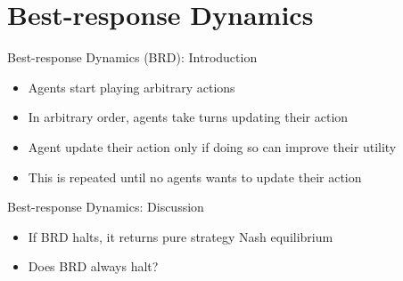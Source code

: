 \documentclass[11pt,aspectratio=169,handout]{beamer}
\begin{document}
 
 \section{Best-response Dynamics}  
  
  \begin{frame}{Best-response Dynamics (BRD): Introduction}
   \begin{itemize}[<+->]
    \item Agents start playing \alert{arbitrary} actions
    \item In arbitrary order, agents take turns updating their action
    \item Agent update their action only if doing so can improve their utility
    \item This is repeated until no agents wants to update their action
   \end{itemize}
   \vspace{1em}
  \end{frame}
  
  
  \begin{frame}{Best-response Dynamics: Discussion}
   \begin{itemize}[<+->]
   \setlength{\itemsep}{1.5em}
    \item If BRD halts, it returns pure strategy Nash equilibrium
    \item Does BRD always halt?
   \end{itemize}
  \end{frame}
  
\end{document}
